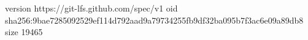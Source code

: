 version https://git-lfs.github.com/spec/v1
oid sha256:9bae7285092529ef114d792aad9a79734255fb9df32ba095b7f3ac6e09a89db8
size 19465
